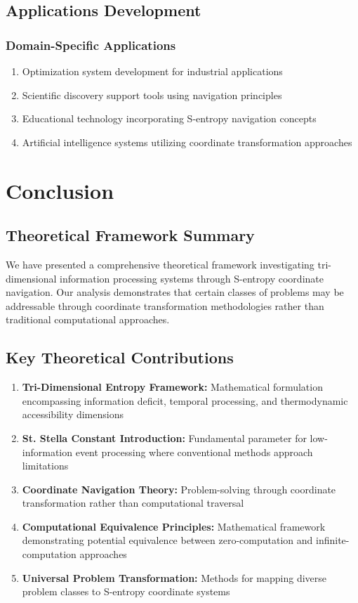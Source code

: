 \documentclass[11pt]{article}
\begin{document}
\subsection{Applications Development}

\subsubsection{Domain-Specific Applications}

\begin{enumerate}
\item Optimization system development for industrial applications
\item Scientific discovery support tools using navigation principles
\item Educational technology incorporating S-entropy navigation concepts
\item Artificial intelligence systems utilizing coordinate transformation approaches
\end{enumerate}

\section{Conclusion}

\subsection{Theoretical Framework Summary}

We have presented a comprehensive theoretical framework investigating tri-dimensional information processing systems through S-entropy coordinate navigation. Our analysis demonstrates that certain classes of problems may be addressable through coordinate transformation methodologies rather than traditional computational approaches.

\subsection{Key Theoretical Contributions}

\begin{enumerate}
\item \textbf{Tri-Dimensional Entropy Framework:} Mathematical formulation encompassing information deficit, temporal processing, and thermodynamic accessibility dimensions
\item \textbf{St. Stella Constant Introduction:} Fundamental parameter for low-information event processing where conventional methods approach limitations
\item \textbf{Coordinate Navigation Theory:} Problem-solving through coordinate transformation rather than computational traversal
\item \textbf{Computational Equivalence Principles:} Mathematical framework demonstrating potential equivalence between zero-computation and infinite-computation approaches
\item \textbf{Universal Problem Transformation:} Methods for mapping diverse problem classes to S-entropy coordinate systems
\end{enumerate}
\end{document}
